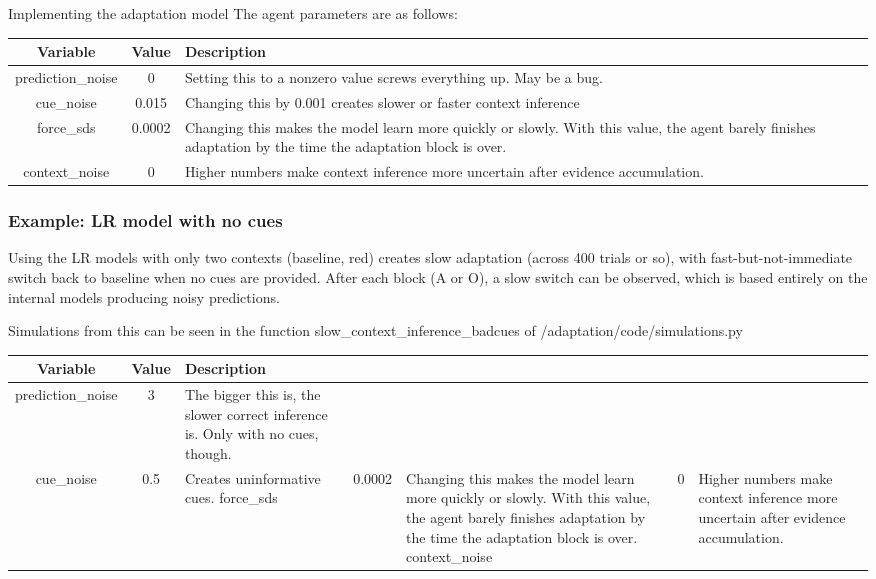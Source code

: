 \documentclass{report}
\begin{document}
\begin{chapter}{Implementing the adaptation model}
The agent parameters are as follows:

\begin{center}
\begin{tabularx}{0.8\textwidth}{ c | c | X}
  Variable & Value & Description \\ \hline
  prediction\_noise & 0 & Setting this to a nonzero value screws everything up. May be a bug. \\  
  cue\_noise & 0.015 & Changing this by 0.001 creates slower or faster context inference \\
  force\_sds & 0.0002 & Changing this makes the model learn more quickly or slowly. With this value, the agent barely finishes adaptation by the time the adaptation block is over. \\
  context\_noise & 0 & Higher numbers make context inference more uncertain after evidence accumulation.
\end{tabularx}
\end{center}

\subsubsection{Example: LR model with no cues}
Using the LR models with only two contexts (baseline, red) creates slow
adaptation (across 400 trials or so), with fast-but-not-immediate switch back
to baseline when no cues are provided. After each block (A or O), a slow switch
can be observed, which is based entirely on the internal models producing noisy
predictions.

Simulations from this can be seen in the function
slow\_context\_inference\_badcues of /adaptation/code/simulations.py

\begin{center}
\begin{tabularx}{0.8\textwidth}{ c | c | X}
  Variable & Value & Description \\ \hline
  prediction\_noise & 3 & The bigger this is, the slower correct inference is. Only with no cues, though. \\  
  cue\_noise & 0.5 & Creates uninformative cues.
  force\_sds & 0.0002 & Changing this makes the model learn more quickly or slowly. With this value, the agent barely finishes adaptation by the time the adaptation block is over.
  context\_noise & 0 & Higher numbers make context inference more uncertain after evidence accumulation.  
\end{tabularx}
\end{center}




\end{chapter}
\end{document}
